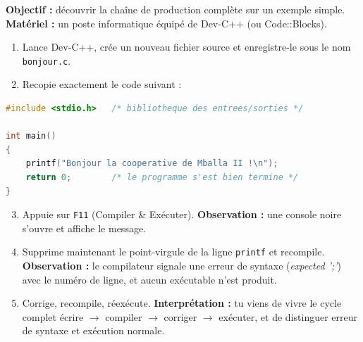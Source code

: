 \documentclass[11pt]{article}
\begin{document}
\begin{experience}
\textbf{Objectif :} découvrir la chaîne de production complète sur un exemple simple.\\
\textbf{Matériel :} un poste informatique équipé de Dev-C++ (ou Code::Blocks).
\begin{enumerate}
\item Lance Dev-C++, crée un nouveau fichier source et enregistre-le sous le nom \texttt{bonjour.c}.
\item Recopie exactement le code suivant :
\end{enumerate}
\begin{lstlisting}[language=C]
#include <stdio.h>   /* bibliotheque des entrees/sorties */

int main()
{
    printf("Bonjour la cooperative de Mballa II !\n");
    return 0;        /* le programme s'est bien termine */
}
\end{lstlisting}
\begin{enumerate}
\setcounter{enumi}{2}
\item Appuie sur \texttt{F11} (Compiler \& Exécuter). \textbf{Observation :} une console noire s'ouvre et affiche le message.
\item Supprime maintenant le point-virgule de la ligne \texttt{printf} et recompile. \textbf{Observation :} le compilateur signale une erreur de syntaxe (\emph{expected ';'}) avec le numéro de ligne, et aucun exécutable n'est produit.
\item Corrige, recompile, réexécute. \textbf{Interprétation :} tu viens de vivre le cycle complet écrire $\to$ compiler $\to$ corriger $\to$ exécuter, et de distinguer erreur de syntaxe et exécution normale.
\end{enumerate}
\end{experience}
\end{document}
